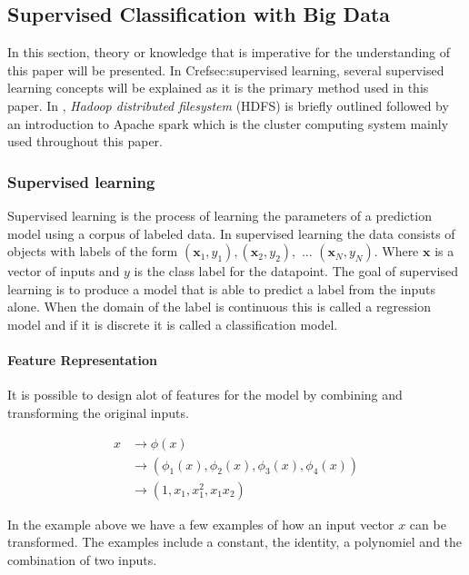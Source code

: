 \subsection{Supervised Classification with Big Data}

In this section, theory or knowledge that is imperative for the understanding of this paper will be presented. In Cref{sec:supervised learning}, several supervised learning concepts will be explained as it is the primary method used in this paper. In , \emph{Hadoop distributed filesystem} (HDFS) is briefly outlined followed by an introduction to Apache spark which is the cluster computing system mainly used throughout this paper.

\subsubsection{Supervised learning}
Supervised learning is the process of learning the parameters of a prediction model using a corpus of labeled data.
In supervised learning the data consists of objects with labels of the form 
$(\textbf{x}_1,y_1),(\textbf{x}_2,y_2), \text{ ... } (\textbf{x}_N,y_N)$.
Where $\textbf{x}$ is a vector of inputs and $y$ is the class label for the datapoint.
The goal of supervised learning is to produce a model that is able to predict a label from the inputs alone.
When the domain of the label is continuous this is called a regression model and if it is discrete it is called a classification model.

\paragraph{Feature Representation}\label{sec:phi}
It is possible to design alot of features for the model by combining and transforming the original inputs.

\begin{align*}
x &\rightarrow \phi(x) \\
&\rightarrow (\phi_1(x), \phi_2(x), \phi_3(x), \phi_4(x)) \\
&\rightarrow (1, x_1, x_1^2, x_1x_2)
\end{align*} 

In the example above we have a few examples of how an input vector $x$ can be transformed.
The examples include a constant, the identity, a polynomiel and the combination of two inputs.

